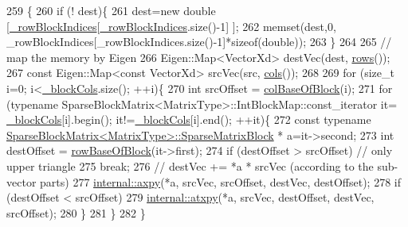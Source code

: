 \begin{DoxyCode}
259   \{
260     \textcolor{keywordflow}{if} (! dest)\{
261       dest=\textcolor{keyword}{new} \textcolor{keywordtype}{double} [\hyperlink{classg2o_1_1SparseBlockMatrix_ab0bd9c6d5b7b8704af1bc679032382e3}{\_rowBlockIndices}[\hyperlink{classg2o_1_1SparseBlockMatrix_ab0bd9c6d5b7b8704af1bc679032382e3}{\_rowBlockIndices}.size()-1] ];
262       memset(dest,0, \_rowBlockIndices[\_rowBlockIndices.size()-1]*\textcolor{keyword}{sizeof}(double));
263     \}
264 
265     \textcolor{comment}{// map the memory by Eigen}
266     Eigen::Map<VectorXd> destVec(dest, \hyperlink{classg2o_1_1SparseBlockMatrix_adf18fb267e545b9036314cf9f8f10473}{rows}());
267     \textcolor{keyword}{const} Eigen::Map<const VectorXd> srcVec(src, \hyperlink{classg2o_1_1SparseBlockMatrix_ab854ca59f370d93229852e32a7b49d3e}{cols}());
268 
269     \textcolor{keywordflow}{for} (\textcolor{keywordtype}{size\_t} i=0; i<\hyperlink{classg2o_1_1SparseBlockMatrix_ae236d56a01ba4d292450a518621b41f8}{\_blockCols}.size(); ++i)\{
270       \textcolor{keywordtype}{int} srcOffset = \hyperlink{classg2o_1_1SparseBlockMatrix_adf282a20d7c77c5949a0d93ca2651271}{colBaseOfBlock}(i);
271       \textcolor{keywordflow}{for} (\textcolor{keyword}{typename} SparseBlockMatrix<MatrixType>::IntBlockMap::const\_iterator it=
      \hyperlink{classg2o_1_1SparseBlockMatrix_ae236d56a01ba4d292450a518621b41f8}{\_blockCols}[i].begin(); it!=\hyperlink{classg2o_1_1SparseBlockMatrix_ae236d56a01ba4d292450a518621b41f8}{\_blockCols}[i].end(); ++it)\{
272         \textcolor{keyword}{const} \textcolor{keyword}{typename} \hyperlink{classg2o_1_1SparseBlockMatrix_ab2f7376cbf055803fda6527dcc43e3be}{SparseBlockMatrix<MatrixType>::SparseMatrixBlock}
      * a=it->second;
273         \textcolor{keywordtype}{int} destOffset = \hyperlink{classg2o_1_1SparseBlockMatrix_a176a2dbe00711e248ea25dc1995c6b4c}{rowBaseOfBlock}(it->first);
274         \textcolor{keywordflow}{if} (destOffset > srcOffset) \textcolor{comment}{// only upper triangle}
275           \textcolor{keywordflow}{break};
276         \textcolor{comment}{// destVec += *a * srcVec (according to the sub-vector parts)}
277         \hyperlink{namespaceg2o_1_1internal_a3beb413c2d04c629c60a8ce5e05ddf8f}{internal::axpy}(*a, srcVec, srcOffset, destVec, destOffset);
278         \textcolor{keywordflow}{if} (destOffset < srcOffset)
279           \hyperlink{namespaceg2o_1_1internal_ad176878dff85b91f1dbabed52cbf696e}{internal::atxpy}(*a, srcVec, destOffset, destVec, srcOffset);
280       \}
281     \}
282   \}
\end{DoxyCode}
